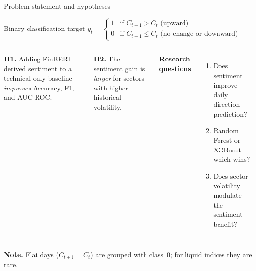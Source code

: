 \documentclass[aspectratio=169,11pt]{beamer}
\newcommand{\heading}[1]{{\color{TecBlue}\textbf{#1}}}
\begin{document}
\begin{frame}{Problem statement and hypotheses}
\small
\begin{block}{Binary classification target}
\centering\small
$y_t = \begin{cases} 1 & \text{if } C_{t+1} > C_t \text{ (upward)} \\ 0 & \text{if } C_{t+1} \leq C_t \text{ (no change or downward)} \end{cases}$
\end{block}

\vspace{2pt}
\begin{columns}[T,onlytextwidth]
\heading{H1.} Adding FinBERT-derived sentiment to a technical-only baseline \textit{improves} Accuracy, F1, and AUC-ROC.

\vspace{4pt}
\heading{H2.} The sentiment gain is \textit{larger} for sectors with higher historical volatility.

\heading{Research questions}
\begin{enumerate}\setlength\itemsep{1pt}
  \item Does sentiment improve daily direction prediction?
  \item Random Forest or XGBoost --- which wins?
  \item Does sector volatility modulate the sentiment benefit?
\end{enumerate}
\end{columns}

\vspace{4pt}
\footnotesize \textbf{Note.} Flat days ($C_{t+1}=C_t$) are grouped with class~0; for liquid indices they are rare.
\end{frame}
\end{document}
